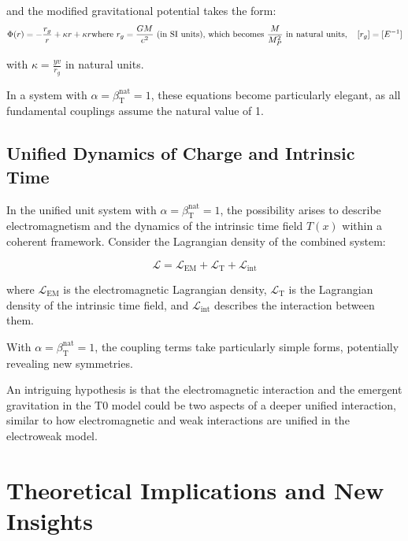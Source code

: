 ﻿\documentclass[12pt,a4paper]{article}
\newcommand{\Tfield}{T(x)}
\newcommand{\betaT}{\beta_{\text{T}}}
\begin{document}
	and the modified gravitational potential takes the form:
	\begin{equation}
		\Phi(r) = -\frac{r_g}{r} + \kappa r + \kappa r\\\text{where } r_g = \frac{GM}{c^2} \text{ (in SI units), which becomes } \frac{M}{M_P^2} \text{ in natural units}, \quad [r_g] = [E^{-1}]

	\end{equation}
	
	with \(\kappa = \frac{y v}{r_g}\) in natural units.
	
	In a system with \(\alpha = \betaT^{\text{nat}} = 1\), these equations become particularly elegant, as all fundamental couplings assume the natural value of 1.
	
	\subsection{Unified Dynamics of Charge and Intrinsic Time}
	
	In the unified unit system with \(\alpha = \betaT^{\text{nat}} = 1\), the possibility arises to describe electromagnetism and the dynamics of the intrinsic time field \(\Tfield\) within a coherent framework. Consider the Lagrangian density of the combined system:
	
	\begin{equation}
		\mathcal{L} = \mathcal{L}_{\text{EM}} + \mathcal{L}_{\text{T}} + \mathcal{L}_{\text{int}}
	\end{equation}
	
	where \(\mathcal{L}_{\text{EM}}\) is the electromagnetic Lagrangian density, \(\mathcal{L}_{\text{T}}\) is the Lagrangian density of the intrinsic time field, and \(\mathcal{L}_{\text{int}}\) describes the interaction between them.
	
	With \(\alpha = \betaT^{\text{nat}} = 1\), the coupling terms take particularly simple forms, potentially revealing new symmetries.
	
	An intriguing hypothesis is that the electromagnetic interaction and the emergent gravitation in the T0 model could be two aspects of a deeper unified interaction, similar to how electromagnetic and weak interactions are unified in the electroweak model.
	
	\section{Theoretical Implications and New Insights}
	
\end{document}
